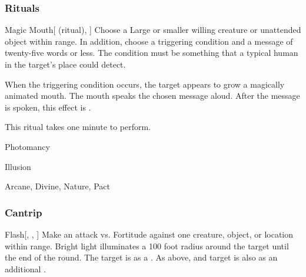 \subsubsection{Rituals}


\lowercase{\hypertarget{spell:Magic Mouth}{}}\label{spell:Magic Mouth}
\begin{attuneability}[\nth{1}]{\hypertarget{spell:Magic Mouth}{Magic Mouth}}[ (ritual), ]
Choose a Large or smaller willing creature or unattended object within \rngclose range.
In addition, choose a triggering condition and a message of twenty-five words or less.
The condition must be something that a typical human in the target's place could detect.

When the triggering condition occurs, the target appears to grow a magically animated mouth.
The mouth speaks the chosen message aloud.
After the message is spoken, this effect is .

This ritual takes one minute to perform.
\end{attuneability}
\vspace{0.25em}


\newpage
\begin{spellsection}{Photomancy}

\begin{spellheader}
\end{spellheader}


 Illusion

 Arcane, Divine, Nature, Pact

\subsubsection{Cantrip}


\begin{freeability}{Flash}[, , ]
Make an attack vs. Fortitude against one creature, object, or location within \rngmed range.
Bright light illuminates a 100 foot radius around the target until the end of the round.
\hit The target is \dazzled as a .
\crit As above, and target is also \dazed as an additional .
\end{freeability}

\end{spellsection}


